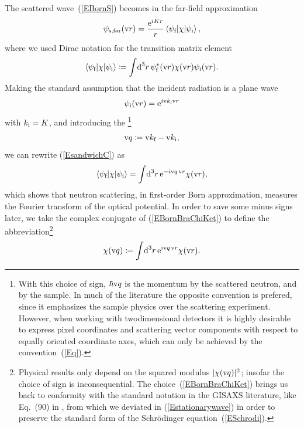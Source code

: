 The scattered wave~(\ref{EBornS})
becomes in the far-field approximation 
\begin{equation}\label{EsandwichC}
  \psi_\text{s,far}(\text{v}{r})
  = \frac{\text{e}^{iKr}}{r}
    \left\langle \psi_{\text{f}}|\chi|\psi_{\text{i}}\right\rangle,
\end{equation}
%
where we used Dirac notation for the transition matrix element
%
\begin{equation}\label{Etrama}
  \left\langle \psi_{\text{f}}|\chi|\psi_{\text{i}}\right\rangle
  \coloneqq  \int\!\text{d}^3r\, \psi^*_{\text{f}}(\text{v}{r})\chi(\text{v}{r})\psi_{\text{i}}(\text{v}{r}).
\end{equation}
%
Making the standard assumption
that the incident radiation is a plane wave
\begin{equation}\label{EPsi0Plane}
  \psi_{\text{i}}(\text{v}{r})=\text{e}^{i \text{v}{k}_{\text{i}} \text{v}{r}}
\end{equation}
with $k_{\text{i}}=K$,
and introducing the \footnote
{With this choice of sign,
%
$\hbar\text{v}{q}$ is the momentum 
%
 by the scattered neutron,
and  by the sample.
In much of the literature the opposite convention is prefered,
since it emphasizes the sample physics over the scattering experiment.
However, when working with twodimensional detectors
it is highly desirable to express pixel coordinates
and scattering vector components 
with respect to equally oriented coordinate axes,
which can only be achieved by the convention~(\ref{Eq}).}
%
\begin{equation}\label{Eq}
  \text{v}{q}\coloneqq \text{v}{k}_{\text{f}}-\text{v}{k}_{\text{i}},
\end{equation}
%
we can rewrite (\ref{EsandwichC}) as
\begin{equation}\label{EBornBraChiKet}
  \left\langle \psi_{\text{f}}|\chi|\psi_{\text{i}}\right\rangle
  = \int\!\text{d}^3r\, \text{e}^{-i\text{v}{q}\,\text{v}{r}}\chi(\text{v}{r}),
\end{equation}
which shows that neutron scattering,
in first-order Born approximation,
measures the Fourier transform
of the optical potential.
%
In order to save some minus signs later,
we take the complex conjugate of (\ref{EBornBraChiKet}) 
to define the abbreviation\footnote
{Physical results only depend on the squared modulus $|\chi(\text{v}{q})|^2$;
insofar the choice of sign is inconsequential.
%
The choice~(\ref{EBornBraChiKet}) brings us back to conformity 
with the standard notation in the GISAXS literature,
like Eq.~(90) in \cite{ReLL09},
from which we deviated in (\ref{Estationarywave})
in order to preserve the standard form
of the Schrödinger equation~(\ref{ESchrodi}).}
\begin{equation}\label{EchiQdef}
   \chi(\text{v}{q}) \coloneqq \int\!\text{d}^3r\, \text{e}^{i\text{v}{q}\,\text{v}{r}}\chi(\text{v}{r}).
\end{equation}
%

